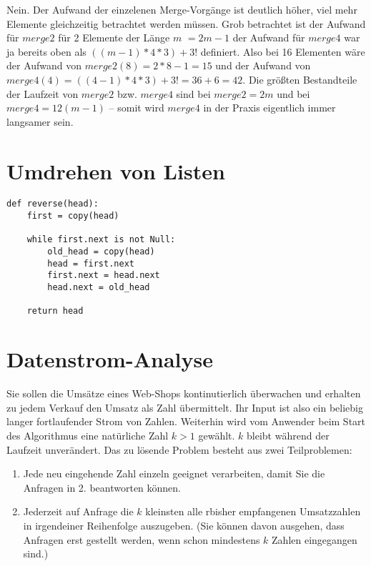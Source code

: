 \documentclass{article}
\begin{document}
Nein. Der Aufwand der einzelenen Merge-Vorgänge ist deutlich höher, viel mehr Elemente
gleichzeitig betrachtet werden müssen. Grob betrachtet ist der Aufwand für $merge2$ für
2 Elemente der Länge $m$ $= 2m - 1$ der Aufwand für $merge4$ war ja bereits oben als
$((m - 1) * 4 * 3) + 3!$ definiert. Also bei 16 Elementen wäre der Aufwand von
$merge2(8) = 2 * 8 - 1 = 15$ und der Aufwand von $merge4(4) = ((4 - 1) * 4 * 3) + 3! = 36 + 6 = 42$.
Die größten Bestandteile der Laufzeit von $merge2$ bzw. $merge4$ sind bei $merge2 = 2m$
und bei $merge4 = 12(m - 1)$ – somit wird $merge4$ in der Praxis eigentlich immer langsamer
sein.

\newpage

\section{Umdrehen von Listen}

\begin{lstlisting}
def reverse(head):
    first = copy(head)

    while first.next is not Null:
        old_head = copy(head)
        head = first.next
        first.next = head.next
        head.next = old_head

    return head
\end{lstlisting}


\section{Datenstrom-Analyse}
Sie sollen die Umsätze eines Web-Shops kontinutierlich überwachen und erhalten zu jedem
Verkauf den Umsatz als Zahl übermittelt. Ihr Input ist also ein beliebig langer fortlaufender
Strom von Zahlen. Weiterhin wird vom Anwender beim Start des Algorithmus eine natürliche Zahl
$k > 1$ gewählt. $k$ bleibt während der Laufzeit unverändert. Das zu lösende Problem besteht
aus zwei Teilproblemen:

\begin{enumerate}
	\item{Jede neu eingehende Zahl einzeln geeignet verarbeiten, damit Sie die Anfragen in 2.
		beantworten können.}
	\item{Jederzeit auf Anfrage die $k$ kleinsten alle rbisher empfangenen Umsatzzahlen in
		irgendeiner Reihenfolge auszugeben. (Sie können davon ausgehen, dass Anfragen erst
		gestellt werden, wenn schon mindestens $k$ Zahlen eingegangen sind.)}
\end{enumerate}
\end{document}
